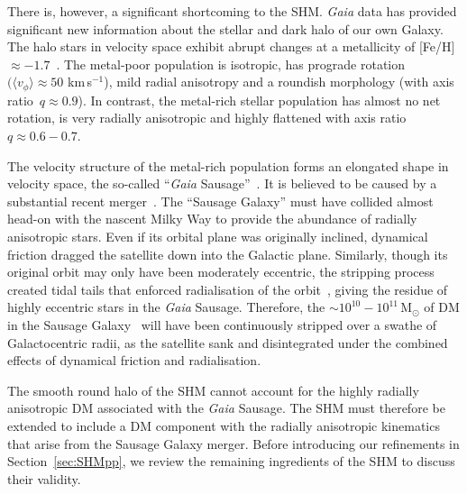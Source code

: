 \documentclass[prd,10pt,twocolumn,showpacs,nofootinbib, aps,superscriptaddress,preprintnumbers]{revtex4-1}
\newcommand{\Msol}{\, \textrm{M}_\odot}
\begin{document}
There is, however, a significant shortcoming to the SHM.
\emph{Gaia} data has provided significant new information 
about the stellar and dark halo of our own Galaxy.
The halo stars in velocity space exhibit abrupt changes at a
metallicity of [Fe/H] $\approx -1.7$~\citep{My18}. The metal-poor
population is isotropic, has prograde rotation $(\langle v_\phi
\rangle \approx 50$ km\,s$^{-1}$), mild radial anisotropy and a
roundish morphology (with axis ratio~$q\approx 0.9$).  
In contrast, the metal-rich
stellar population has almost no net rotation, is very radially
anisotropic and highly flattened with axis ratio~$q \approx 0.6 -
0.7$.



The velocity structure of the metal-rich population forms an elongated shape in velocity space, 
the so-called ``\emph{Gaia} Sausage''~\citep{Be18,MyGC}. 
It is believed to be caused by a substantial
recent merger~\citep{Be18,He18,Kr18}. The ``Sausage Galaxy'' must have collided
almost head-on with the nascent Milky Way to provide the abundance of
radially anisotropic stars. Even if its orbital plane was originally
inclined, dynamical friction dragged the satellite down into the
Galactic plane. Similarly, though its original orbit may only have
been moderately eccentric, the stripping process created tidal tails
that enforced radialisation of the orbit~\citep{Am17}, giving the
residue of highly eccentric stars in the \emph{Gaia}
Sausage. Therefore, the $\sim 10^{10}-10^{11}\Msol$ of DM in the
Sausage Galaxy~\citep{Be18,MyGC} will have been continuously stripped
over a swathe of Galactocentric radii, as the satellite sank and
disintegrated under the combined effects of dynamical friction and
radialisation.

The smooth round halo of the SHM cannot account for the highly
radially anisotropic DM associated with the \emph{Gaia} Sausage.
The SHM must therefore be extended to include a DM component with the radially
anisotropic kinematics that arise from the Sausage Galaxy merger. 
Before introducing our refinements in Section~\ref{sec:SHMpp},
we review the remaining ingredients of the SHM to discuss their validity.
\end{document}
